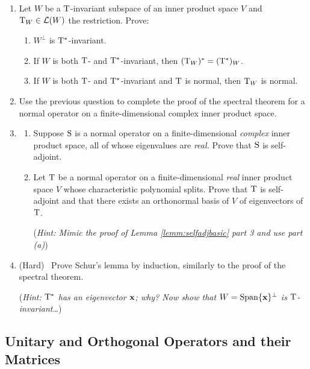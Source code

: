 \begin{exercises}
\begin{enumerate}
	    
	  \item\label{exs:normalspec1} Let $W$ be a $\mathrm{T}$-invariant subspace of an inner product space $V$ and $\mathrm{T}_{W}\in\mathcal{L}(W)$ the restriction. Prove:
	  \begin{enumerate}
	    \item $W^\perp$ is $\mathrm{T}^*$-invariant.
	    \item If $W$ is both $\mathrm{T}$- and $\mathrm{T}^*$-invariant, then $(\mathrm{T}_{W})^*=(\mathrm{T}^*)_{W}$.
	    \item If $W$ is both $\mathrm{T}$- and $\mathrm{T}^*$-invariant and $\mathrm{T}$ is normal, then $\mathrm{T}_{W}$ is normal.
	  \end{enumerate}
	  
	  
	  \item\label{exs:normalspec2} Use the previous question to complete the proof of the spectral theorem for a normal operator on a finite-dimensional complex inner product space.
	  
	  
	  \item\begin{enumerate}
	    \item Suppose $\mathrm{S}$ is a normal operator on a finite-dimensional \emph{complex} inner product space, all of whose eigenvalues are \emph{real.} Prove that $\mathrm{S}$ is self-adjoint.
	    \item Let $\mathrm{T}$ be a normal operator on a finite-dimensional \emph{real} inner product space $V$ whose characteristic polynomial splits. Prove that $\mathrm{T}$ is self-adjoint and that there exists an orthonormal basis of $V$ of eigenvectors of $\mathrm{T}$.\par
	    (\emph{Hint: Mimic the proof of Lemma \ref{lemm:selfadjbasic} part 3 and use part (a)})
	  \end{enumerate}
	  
	  
	  \item (Hard) \ Prove Schur's lemma by induction, similarly to the proof of the spectral theorem.\par
	  (\emph{Hint: $\mathrm{T}^*$ has an eigenvector ${\mathbf{x}}$; why? Now show that $W=\operatorname{Span}\{{\mathbf{x}}\}^\perp$ is $\mathrm{T}$-invariant\ldots})
	\end{enumerate}
\end{exercises}

\clearpage



\subsection{Unitary and Orthogonal Operators and their Matrices}\label{sec:unitary}

